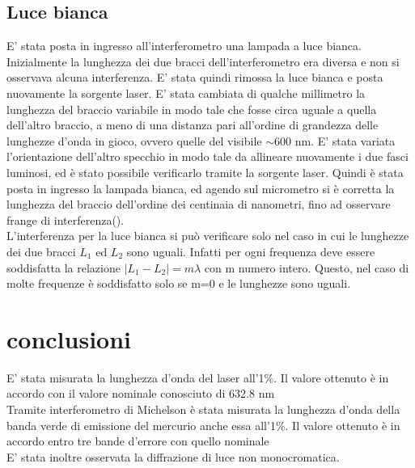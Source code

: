 \subsection{Luce bianca}
E' stata posta in ingresso all'interferometro una lampada a luce bianca.\\
Inizialmente la lunghezza dei due bracci dell'interferometro era diversa e non si osservava alcuna interferenza. E' stata quindi rimossa la luce bianca e posta nuovamente la sorgente laser. E' stata cambiata di qualche millimetro la lunghezza del braccio variabile in modo tale che fosse circa uguale a quella dell'altro braccio, a meno di una distanza pari all'ordine di grandezza delle lunghezze d'onda in gioco, ovvero quelle del visibile $\sim$600 nm. E' stata variata l'orientazione dell'altro specchio in modo tale da allineare nuovamente i due fasci luminosi, ed è stato possibile verificarlo tramite la sorgente laser. Quindi è stata posta in ingresso la lampada bianca, ed agendo sul micrometro si è corretta la lunghezza del braccio dell'ordine dei centinaia di nanometri, fino ad osservare frange di interferenza().\\
L'interferenza per la luce bianca si può verificare solo nel caso in cui le lunghezze dei due bracci $L_1$ ed $L_2$ sono uguali. Infatti per ogni frequenza deve essere soddisfatta la relazione $\mid L_1-L_2 \mid=m\lambda$ con m numero intero. Questo, nel caso di molte frequenze è soddisfatto solo se m=0 e le lunghezze sono uguali.\\
\section{conclusioni}
E' stata misurata la lunghezza d'onda del laser all'1\%. Il valore ottenuto è in accordo con il valore nominale conosciuto di 632.8 nm\\
Tramite interferometro di Michelson è stata misurata la lunghezza d'onda della banda verde di emissione del mercurio anche essa all'1\%. Il valore ottenuto è in accordo entro tre bande d'errore  con quello nominale\\ E' stata inoltre osservata la diffrazione di luce non monocromatica.
